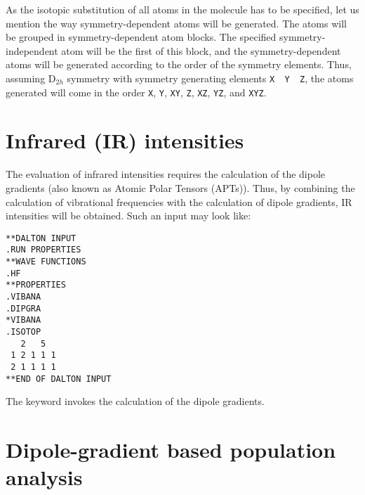 As the isotopic substitution of all atoms in the molecule has to be
specified, let us mention the way symmetry-dependent atoms will be
generated. The atoms will be grouped in symmetry-dependent atom
blocks. The specified symmetry-independent atom will be the first of
this block, and the symmetry-dependent atoms will be generated
according to the order of the symmetry elements. Thus, assuming
D$_{2h}$ symmetry with symmetry generating elements \verb|X  Y  Z|,
the atoms generated will come in the order \verb|X|, \verb|Y|,
\verb|XY|, \verb|Z|, \verb|XZ|, \verb|YZ|, and \verb|XYZ|.

\section{Infrared (IR) intensities}\label{sec:irint}

\begin{center}
\end{center}

 The evaluation of infrared intensities
requires the calculation of the
dipole gradients (also known as Atomic Polar Tensors (APTs)). Thus, by
combining the calculation of vibrational frequencies with the
calculation of dipole gradients, IR intensities will be obtained. Such
an input may look like:

\begin{verbatim}
**DALTON INPUT
.RUN PROPERTIES
**WAVE FUNCTIONS
.HF
**PROPERTIES
.VIBANA
.DIPGRA
*VIBANA
.ISOTOP
   2   5
 1 2 1 1 1
 2 1 1 1 1
**END OF DALTON INPUT
\end{verbatim}

\noindent The keyword  invokes the calculation of the dipole
gradients.

\section{Dipole-gradient based population analysis}

